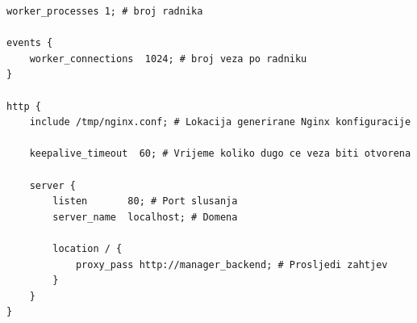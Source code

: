 \begin{lstlisting}[float=h]
worker_processes 1; # broj radnika

events {
    worker_connections  1024; # broj veza po radniku
}

http {
    include /tmp/nginx.conf; # Lokacija generirane Nginx konfiguracije

    keepalive_timeout  60; # Vrijeme koliko dugo ce veza biti otvorena

    server {
        listen       80; # Port slusanja
        server_name  localhost; # Domena

        location / {
            proxy_pass http://manager_backend; # Prosljedi zahtjev
        }
    }
}
\end{lstlisting}
